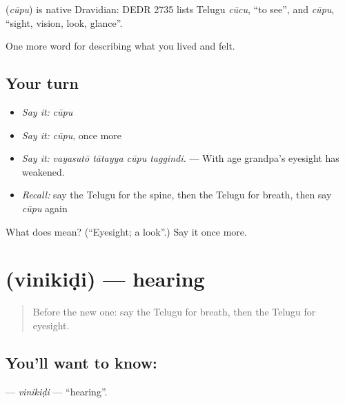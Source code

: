 \begin{cousinweb}
\textbf{} (\emph{cūpu}) is native Dravidian: DEDR 2735 lists Telugu \emph{cūcu}, \textquotedblleft{}to see\textquotedblright{}, and \emph{cūpu}, \textquotedblleft{}sight, vision, look, glance\textquotedblright{}.
\end{cousinweb}

\begin{grammarlens}[title={What you've built}]
One more word for describing what you lived and felt.
\end{grammarlens}

\subsection*{Your turn}
\begin{itemize}
\raggedright
  \item \emph{Say it:} \emph{cūpu}
  \item \emph{Say it:} \emph{cūpu}, once more
  \item \emph{Say it:} \emph{vayasutō tātayya cūpu taggindi.} — With age grandpa's eyesight has weakened.
  \item \emph{Recall:} say the Telugu for the spine, then the Telugu for breath, then say \emph{cūpu} again
\end{itemize}

\begin{tcolorbox}[breakable,colback=teal!4,colframe=teal!35!black,title={Before you move on}]
What does  mean? (\textquotedblleft{}Eyesight; a look\textquotedblright{}.) Say it once more.
\end{tcolorbox}
\section[\texorpdfstring{\te{వినికిడి} (vinikiḍi)}{వినికిడి (vinikiḍi)}]{ (vinikiḍi) — hearing}

\label{lesson:TE-C516-vinikidi}



\begin{quote}
Before the new one: say the Telugu for breath, then the Telugu for eyesight.
\end{quote}

\subsection*{You'll want to know: }
\textbf{} — \emph{vinikiḍi} — \textquotedblleft{}hearing\textquotedblright{}.

